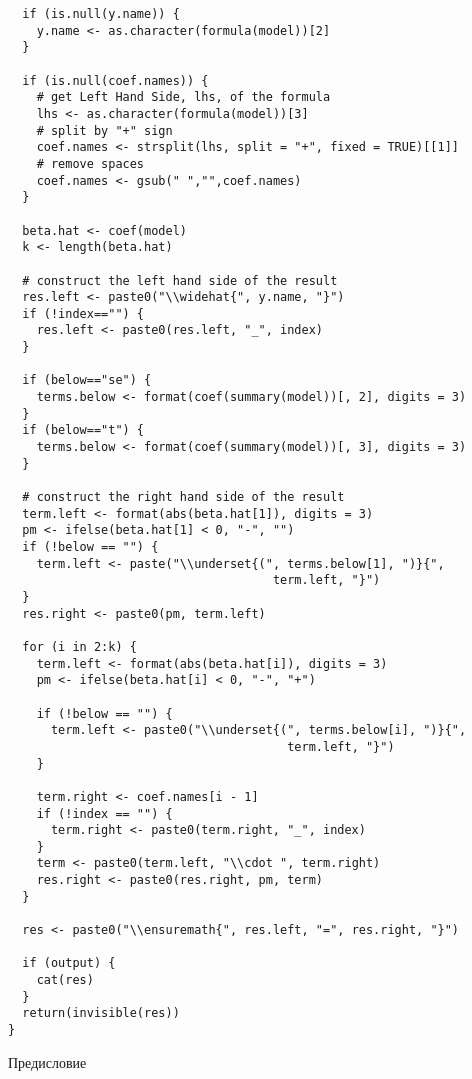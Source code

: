 \documentclass[11pt, openany]{book}
\theoremstyle{definition}
\begin{document}
\begin{verbatim}
  if (is.null(y.name)) {
    y.name <- as.character(formula(model))[2]
  }

  if (is.null(coef.names)) {
    # get Left Hand Side, lhs, of the formula
    lhs <- as.character(formula(model))[3]
    # split by "+" sign
    coef.names <- strsplit(lhs, split = "+", fixed = TRUE)[[1]]
    # remove spaces
    coef.names <- gsub(" ","",coef.names)
  }

  beta.hat <- coef(model)
  k <- length(beta.hat)

  # construct the left hand side of the result
  res.left <- paste0("\\widehat{", y.name, "}")
  if (!index=="") {
    res.left <- paste0(res.left, "_", index)
  }

  if (below=="se") {
    terms.below <- format(coef(summary(model))[, 2], digits = 3)
  }
  if (below=="t") {
    terms.below <- format(coef(summary(model))[, 3], digits = 3)
  }

  # construct the right hand side of the result
  term.left <- format(abs(beta.hat[1]), digits = 3)
  pm <- ifelse(beta.hat[1] < 0, "-", "")
  if (!below == "") {
    term.left <- paste("\\underset{(", terms.below[1], ")}{",
                                     term.left, "}")
  }
  res.right <- paste0(pm, term.left)

  for (i in 2:k) {
    term.left <- format(abs(beta.hat[i]), digits = 3)
    pm <- ifelse(beta.hat[i] < 0, "-", "+")

    if (!below == "") {
      term.left <- paste0("\\underset{(", terms.below[i], ")}{",
                                       term.left, "}")
    }

    term.right <- coef.names[i - 1]
    if (!index == "") {
      term.right <- paste0(term.right, "_", index)
    }
    term <- paste0(term.left, "\\cdot ", term.right)
    res.right <- paste0(res.right, pm, term)
  }

  res <- paste0("\\ensuremath{", res.left, "=", res.right, "}")

  if (output) {
    cat(res)
  }
  return(invisible(res))
}

\end{verbatim}





\newpage
\thispagestyle{empty}
{\LARGE Предисловие} %
\end{document}
